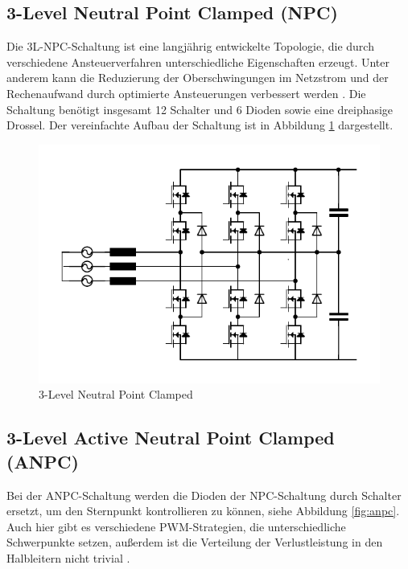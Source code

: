 	\subsection{3-Level Neutral Point Clamped (NPC)}
		Die 3L-\gls{NPC}-Schaltung ist eine langjährig entwickelte Topologie, die durch verschiedene Ansteuerverfahren unterschiedliche Eigenschaften erzeugt. Unter anderem kann die Reduzierung der Oberschwingungen im Netzstrom und der Rechenaufwand durch optimierte Ansteuerungen verbessert werden \cite{NPC}. Die Schaltung benötigt insgesamt 12 Schalter und 6 Dioden sowie eine dreiphasige Drossel. Der vereinfachte Aufbau der Schaltung ist in Abbildung \ref{fig:3l-npc} dargestellt.
		\begin{figure}[H]
			\centering
			\includegraphics[width=0.9\linewidth]{content/Grafiken/3L-NPC}
			\caption{3-Level Neutral Point Clamped}
			\label{fig:3l-npc}
		\end{figure}

	\subsection{3-Level Active Neutral Point Clamped (ANPC)}
		Bei der \gls{ANPC}-Schaltung werden die Dioden der \gls{NPC}-Schaltung durch Schalter ersetzt, um den Sternpunkt kontrollieren zu können, siehe Abbildung \ref{fig:anpc}. Auch hier gibt es verschiedene \gls{PWM}-Strategien, die unterschiedliche Schwerpunkte setzen, außerdem ist die Verteilung der Verlustleistung in den Halbleitern nicht trivial \cite{ANPC}.
	
